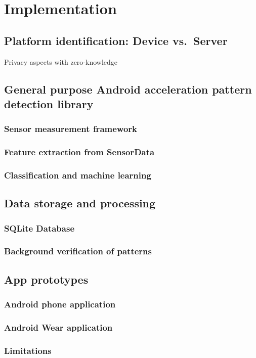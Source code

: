 \chapter{Implementation}\label{chapter:implementation}

\section{Platform identification: Device vs.\ Server}

Privacy aspects with zero-knowledge \cite{bhargav2006privacy}

\section{General purpose Android acceleration pattern detection library}

\subsection{Sensor measurement framework}
\subsection{Feature extraction from SensorData}
\subsection{Classification and machine learning}

\section{Data storage and processing}
\subsection{SQLite Database}
\subsection{Background verification of patterns}

\section{App prototypes}

\subsection{Android phone application}
\subsection{Android Wear application}
\subsection{Limitations}